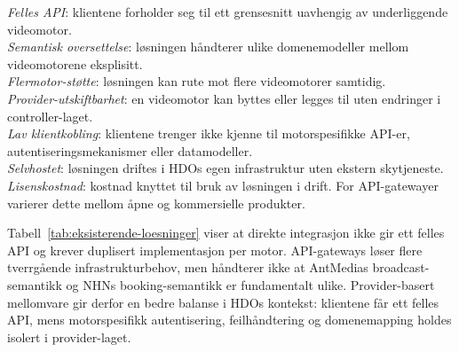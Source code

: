 \begin{table}[H]
\vspace{0.5em}
\begin{minipage}{\textwidth}
\footnotesize
\textit{Felles API}: klientene forholder seg til ett grensesnitt uavhengig av underliggende videomotor.\\
\textit{Semantisk oversettelse}: løsningen håndterer ulike domenemodeller mellom videomotorene eksplisitt.\\
\textit{Flermotor-støtte}: løsningen kan rute mot flere videomotorer samtidig.\\
\textit{Provider-utskiftbarhet}: en videomotor kan byttes eller legges til uten endringer i controller-laget.\\
\textit{Lav klientkobling}: klientene trenger ikke kjenne til motorspesifikke API-er, autentiseringsmekanismer eller datamodeller.\\
\textit{Selvhostet}: løsningen driftes i HDOs egen infrastruktur uten ekstern skytjeneste.\\
\textit{Lisenskostnad}: kostnad knyttet til bruk av løsningen i drift. For API-gatewayer varierer dette mellom åpne og kommersielle produkter.
\end{minipage}
\end{table}

Tabell~\ref{tab:eksisterende-loesninger} viser at direkte integrasjon
ikke gir ett felles API og krever duplisert implementasjon per motor.
API-gateways løser flere tverrgående infrastrukturbehov, men håndterer
ikke at AntMedias broadcast-semantikk og NHNs booking-semantikk er
fundamentalt ulike. Provider-basert mellomvare gir derfor en bedre
balanse i HDOs kontekst: klientene får ett felles API, mens
motorspesifikk autentisering, feilhåndtering og domenemapping holdes
isolert i provider-laget. %